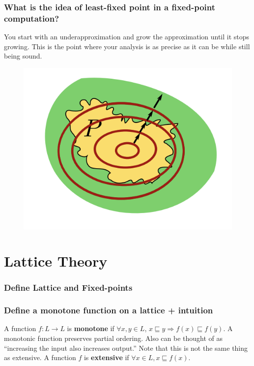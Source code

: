 \documentclass[12pt]{article}
\theoremstyle{remark}
\theoremstyle{remark}
\begin{document}
\subsubsection{What is the idea of least-fixed point in a fixed-point computation?}
You start with an underapproximation and grow the approximation until it stops growing. This is the point where your analysis is as precise as it can be while still being sound.
\begin{figure}[h]
    \centering
    \includegraphics[scale=0.5]{least-fixed-point.png}
\end{figure}

\section{Lattice Theory}
\subsubsection{Define Lattice and Fixed-points}

\subsubsection{Define a monotone function on a lattice + intuition}
A function $f: L \to L$ is \textbf{monotone} if $\forall x,y \in L$, $x \sqsubseteq y \Rightarrow f(x) \sqsubseteq f(y)$. A monotonic function preserves partial ordering. Also can be thought of as ``increasing the input also increases output.'' Note that this is not the same thing as extensive. A function $f$ is \textbf{extensive} if $\forall x \in L, x \sqsubseteq f(x)$.
\end{document}

